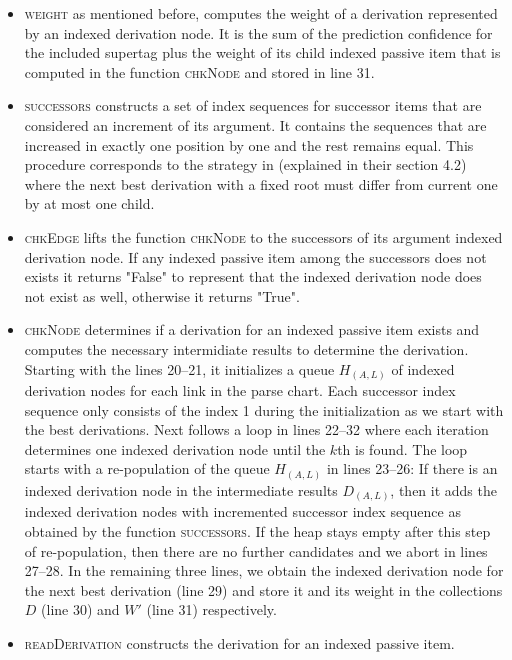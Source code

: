 \documentclass[../document.tex]{subfiles}
\begin{document}
    \begin{itemize}
        \item \textsc{weight} as mentioned before, computes the weight of a derivation represented by an indexed derivation node.
            It is the sum of the prediction confidence for the included supertag plus the weight of its child indexed passive item that is computed in the function \textsc{chkNode} and stored in line 31.
        \item \textsc{successors} constructs a set of index sequences for successor items that are considered an increment of its argument.
            It contains the sequences that are increased in exactly one position by one and the rest remains equal.
            This procedure corresponds to the strategy in  (explained in their section 4.2) where the next best derivation with a fixed root must differ from current one by at most one child.
        \item \textsc{chkEdge} lifts the function \textsc{chkNode} to the successors of its argument indexed derivation node.
            If any indexed passive item among the successors does not exists it returns "False" to represent that the indexed derivation node does not exist as well, otherwise it returns "True".
        \item \textsc{chkNode} determines if a derivation for an indexed passive item exists and computes the necessary intermidiate results to determine the derivation.
            Starting with the lines 20--21, it initializes a queue \(H_{(A, L)}\) of indexed derivation nodes for each link in the parse chart.
            Each successor index sequence only consists of the index 1 during the initialization as we start with the best derivations.
            Next follows a loop in lines 22--32 where each iteration determines one indexed derivation node until the \(k\)th is found.
            The loop starts with a re-population of the queue \(H_{(A, L)}\) in lines 23--26:
                If there is an indexed derivation node in the intermediate results \(D_{(A, L)}\), then it adds the indexed derivation nodes with incremented successor index sequence as obtained by the function \textsc{successors}.
            If the heap stays empty after this step of re-population, then there are no further candidates and we abort in lines 27--28.
            In the remaining three lines, we obtain the indexed derivation node for the next best derivation (line 29) and store it and its weight in the collections $D$ (line 30) and $W'$ (line 31) respectively.
        \item \textsc{readDerivation} constructs the derivation for an indexed passive item.

\end{itemize}
\end{document}

